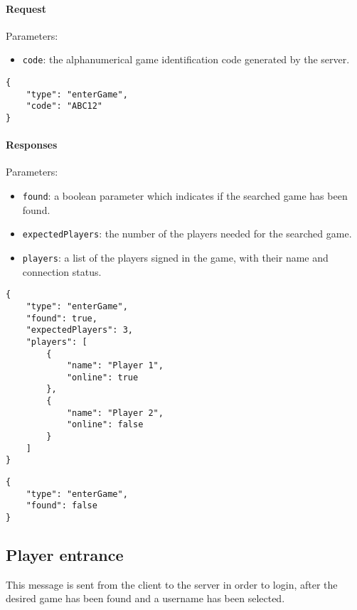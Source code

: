 \documentclass[a4paper]{article}
\begin{document}
	\paragraph{Request} Parameters:

	\begin{itemize}
		\item \verb|code|: the alphanumerical game identification code generated by the server.
	\end{itemize}

	\begin{verbatim}
{
	"type": "enterGame",
	"code": "ABC12"
}
	\end{verbatim}

	\paragraph{Responses} Parameters:

	\begin{itemize}
		\item \verb|found|: a boolean parameter which indicates if the searched game has been found.
		\item \verb|expectedPlayers|: the number of the players needed for the searched game.
		\item \verb|players|: a list of the players signed in the game, with their name and connection status.
	\end{itemize}

	\begin{multicols}{2}

		\begin{verbatim}
{
	"type": "enterGame",
	"found": true,
	"expectedPlayers": 3,
	"players": [
		{
			"name": "Player 1",
			"online": true
		},
		{
			"name": "Player 2",
			"online": false
		}
	]
}
		\end{verbatim}

		\begin{verbatim}
{
	"type": "enterGame",
	"found": false
}
		\end{verbatim}

	\end{multicols}

	\subsection{Player entrance}

	This message is sent from the client to the server in order to login, after the desired game has been found and a username has been selected.
\end{document}

